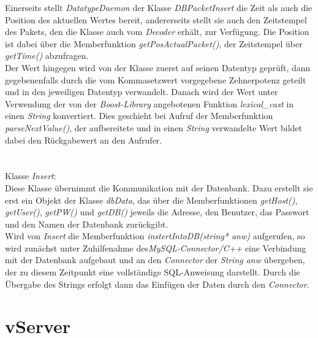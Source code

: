 \documentclass[fontsize = 12pt, paper = a4]{scrreprt}
\begin{document}
Einerseits stellt \textit{DatatypeDaemon} der Klasse \textit{DBPacketInsert} die Zeit als auch die Position des aktuellen Wertes bereit, andererseits stellt sie auch den Zeitstempel des Pakets, den die Klasse auch vom \textit{Decoder} erhält, zur Verfügung. Die Position ist dabei über die Memberfunktion \textit{getPosActualPacket()}, der Zeitstempel über \textit{getTime()} abzufragen.\\
Der Wert hingegen wird von der Klasse zuerst auf seinen Datentyp geprüft, dann gegebenenfalls durch die vom Kommasetzwert vorgegebene Zehnerpotenz geteilt und in den jeweiligen Datentyp verwandelt. Danach wird der Wert unter Verwendung der von der \textit{Boost-Library} angebotenen Funktion \textit{lexical\_cast} in einen \textit{String} konvertiert. Dies geschieht bei Aufruf der Memberfunktion \textit{parseNextValue()}, der aufbereitete und in einen \textit{String} verwandelte Wert bildet dabei den Rückgabewert an den Aufrufer.\\
\\
\\
Klasse \textit{Insert}:\\
Diese Klasse übernimmt die Kommunikation mit der Datenbank. Dazu erstellt sie erst ein Objekt der Klasse \textit{dbData}, das über die Memberfunktionen \textit{getHost()}, \textit{getUser()}, \textit{getPW()} und \textit{getDB()} jeweils die Adresse, den Benutzer, das Passwort und den Namen der Datenbank zurückgibt.\\
Wird von \textit{Insert} die Memberfunktion \textit{instertIntoDB(string* anw)} aufgerufen, so wird zunächst unter Zuhilfenahme des\textit{MySQL-Connector/C++} eine Verbindung mit der Datenbank aufgebaut und an den \textit{Connector} der \textit{String anw} übergeben, der zu diesem Zeitpunkt eine vollständige SQL-Anweisung darstellt. Durch die Übergabe des Strings erfolgt dann das Einfügen der Daten durch den \textit{Connector}.






\section{vServer}
\end{document}
